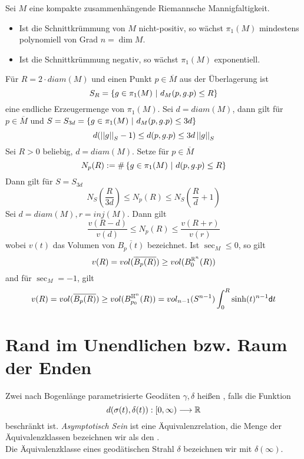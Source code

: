 \documentclass{book}
\renewcommand{\d}{\textsf{d}}
\renewcommand{\l}[1]{\overline{#1}}
\begin{document}
\Prop{}
Sei $M$ eine kompakte zusammenhängende Riemannsche Mannigfaltigkeit.
\begin{itemize}
\item Ist die Schnittkrümmung von $M$ nicht-positiv, so wächst $\pi_1(M)$ mindestens polynomiell von Grad $n = \dim M$.
\item Ist die Schnittkrümmung negativ, so wächst $\pi_1(M)$ exponentiell.
\end{itemize}
\begin{Beweis}{}
Für $R = 2\cdot diam(M)$ und einen Punkt $p \in \l M$ aus der Überlagerung ist
\[ S_R = \set{g \in \pi_1(M)}{ d_M(p, g.p) \leq R } \]
eine endliche Erzeugermenge von $\pi_1(M)$.
Sei $d = diam(M)$, dann gilt für $p \in \l M$ und $S = S_{3d} = \set{g \in \pi_1(M)}{ d_M(p, g.p) \leq 3d }$ 
\[ d (\left|\left|g\right|\right|_S - 1) \leq d(p, g.p) \leq 3d \left|\left|g\right|\right|_S \]
\Kor{}
Sei $R > 0$ beliebig, $d = diam(M)$. Setze für $p \in \l M$
\[ N_p(R) := \# \set{g\in \pi_1(M)}{d(p,g.p) \leq R} \]
Dann gilt für $S = S_{3d}$
\[ N_S(\frac{R}{3d}) \leq N_p(R) \leq N_S(\frac{R}{d} + 1) \]
Sei $d = diam(M), r = inj(M)$. Dann gilt
\[ \frac{v(R-d)}{v(d)} \leq N_p(R) \leq \frac{v(R+ r)}{v(r)} \]
wobei $v(t)$ das Volumen von $\l {B_p(t)}$ bezeichnet.
Ist $\sec_M \leq 0$, so gilt
\[ v(R) = vol(\l{B_p(R)}) \geq vol(B_0^{\R^n}(R)) \]
and für $\sec_M = -1$, gilt
\[ v(R) = vol(\l{B_p(R)}) \geq vol(B_{p_0}^{\H^n}(R)) = vol_{n-1}(S^{n-1}) \int^R_0 \sinh(t)^{n-1} \d t \]
\end{Beweis}

\newpage
\section{Rand im Unendlichen bzw. Raum der Enden}
\Def{}
Zwei nach Bogenlänge parametrisierte Geodäten $\gamma, \delta$ heißen , falls die Funktion
\[ d(\sigma(t),\delta(t)) : [0,\infty) \overset{}{\longrightarrow} \mathbb{R} \]
beschränkt ist. \textit{Asymptotisch Sein} ist eine Äquivalenzrelation, die Menge der Äquivalenzklassen bezeichnen wir als den .\\
Die Äquivalenzklasse eines geodätischen Strahl $\delta$ bezeichnen wir mit $\delta(\infty)$.
\end{document}
